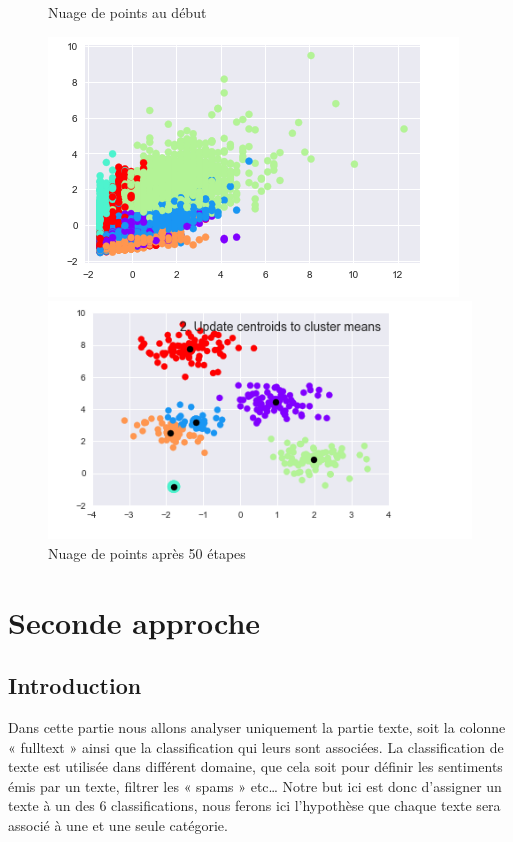 \documentclass[11pt]{article}
\begin{document}
\begin{figure}[!htb]
  \centering
    \caption{Nuage de points au début}
    \includegraphics[width=\textwidth]{kmeansdeb.png}


  \centering
    \caption{Nuage de points après 50 étapes}
    \includegraphics[width=\textwidth]{kmeansfin.png}


\end{figure}


\section{Seconde approche}

\subsection {Introduction}

Dans cette partie nous allons analyser uniquement la partie texte, soit la colonne « fulltext » ainsi que la classification qui leurs sont associées.
La classification de texte est utilisée dans différent domaine, que cela soit pour définir les sentiments émis par un texte, filtrer les « spams » etc…
Notre but ici est donc d’assigner un texte à un des 6 classifications, nous ferons ici l’hypothèse que chaque texte sera associé à une et une seule catégorie. 
\end{document}

